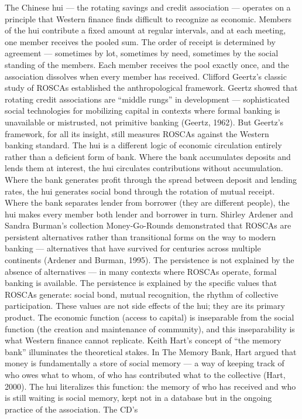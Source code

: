 The Chinese hui — the rotating savings and credit association — operates on a principle that Western finance finds difficult to recognize as economic. Members of the hui contribute a fixed amount at regular intervals, and at each meeting, one member receives the pooled sum. The order of receipt is determined by agreement — sometimes by lot, sometimes by need, sometimes by the social standing of the members. Each member receives the pool exactly once, and the association dissolves when every member has received. Clifford Geertz’s classic study of ROSCAs established the anthropological framework. Geertz showed that rotating credit associations are “middle rungs” in development — sophisticated social technologies for mobilizing capital in contexts where formal banking is unavailable or mistrusted, not primitive banking (Geertz, 1962). But Geertz’s framework, for all its insight, still measures ROSCAs against the Western banking standard. The hui is a different logic of economic circulation entirely rather than a deficient form of bank. Where the bank accumulates deposits and lends them at interest, the hui circulates contributions without accumulation. Where the bank generates profit through the spread between deposit and lending rates, the hui generates social bond through the rotation of mutual receipt. Where the bank separates lender from borrower (they are different people), the hui makes every member both lender and borrower in turn. Shirley Ardener and Sandra Burman’s collection Money-Go-Rounds demonstrated that ROSCAs are persistent alternatives rather than transitional forms on the way to modern banking — alternatives that have survived for centuries across multiple continents (Ardener and Burman, 1995). The persistence is not explained by the absence of alternatives — in many contexts where ROSCAs operate, formal banking is available. The persistence is explained by the specific values that ROSCAs generate: social bond, mutual recognition, the rhythm of collective participation. These values are not side effects of the hui; they are its primary product. The economic function (access to capital) is inseparable from the social function (the creation and maintenance of community), and this inseparability is what Western finance cannot replicate. Keith Hart’s concept of “the memory bank” illuminates the theoretical stakes. In The Memory Bank, Hart argued that money is fundamentally a store of social memory — a way of keeping track of who owes what to whom, of who has contributed what to the collective (Hart, 2000). The hui literalizes this function: the memory of who has received and who is still waiting is social memory, kept not in a database but in the ongoing practice of the association. The CD’s

